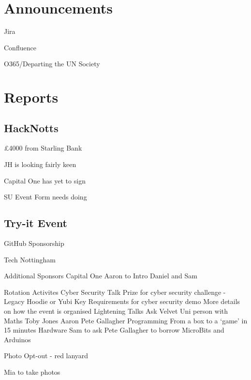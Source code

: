 \documentclass[11pt,hacksoc]{meetingmins}
\begin{document}
\maketitle

\section{Announcements}
\begin{items}
	\item Jira
	\item Confluence
	\item O365/Departing the UN Society
\end{items}

\section{Reports}

\subsection{HackNotts}
\begin{items}
	\item \pounds4000 from Starling Bank
	\item JH is looking fairly keen
	\item Capital One has yet to sign
	\item SU Event Form needs doing
\end{items}

\subsection{Try-it Event}
\begin{items}
	\item GitHub Sponsorship	
	\item Tech Nottingham
	\item Additional Sponsors
		\subitem Capital One
			\subsubitem Aaron to Intro Daniel and Sam
	\item Rotation Activites
		\subitem Cyber Security Talk
			\subsubitem Prize for cyber security challenge - Legacy Hoodie or Yubi Key
			\subsubitem Requirements for cyber security demo
			\subsubitem More details on how the event is organised
		\subitem Lightening Talks
			\subsubitem Ask Velvet
			\subsubitem Uni person with Maths
			\subsubitem Toby Jones
			\subsubitem Aaron
			\subsubitem Pete Gallagher
		\subitem Programming
			\subsubitem From a box to a `game' in 15 minutes
		\subitem Hardware
			\subsubitem Sam to ask Pete Gallagher to borrow MicroBits and Arduinos
	\item Photo Opt-out - red lanyard
	\item Mia to take photos
\end{items}
\end{document}
